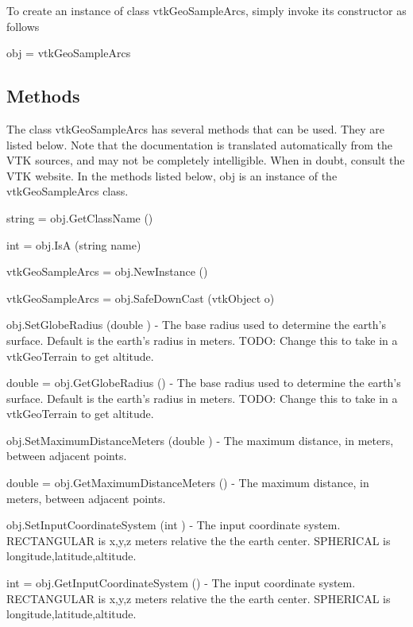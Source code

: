 To create an instance of class vtk\-Geo\-Sample\-Arcs, simply invoke its constructor as follows \begin{DoxyVerb}  obj = vtkGeoSampleArcs
\end{DoxyVerb}
 \hypertarget{vtkwidgets_vtkxyplotwidget_Methods}{}\subsection{Methods}\label{vtkwidgets_vtkxyplotwidget_Methods}
The class vtk\-Geo\-Sample\-Arcs has several methods that can be used. They are listed below. Note that the documentation is translated automatically from the V\-T\-K sources, and may not be completely intelligible. When in doubt, consult the V\-T\-K website. In the methods listed below, {\ttfamily obj} is an instance of the vtk\-Geo\-Sample\-Arcs class. 
\begin{DoxyItemize}
\item {\ttfamily string = obj.\-Get\-Class\-Name ()}  
\item {\ttfamily int = obj.\-Is\-A (string name)}  
\item {\ttfamily vtk\-Geo\-Sample\-Arcs = obj.\-New\-Instance ()}  
\item {\ttfamily vtk\-Geo\-Sample\-Arcs = obj.\-Safe\-Down\-Cast (vtk\-Object o)}  
\item {\ttfamily obj.\-Set\-Globe\-Radius (double )} -\/ The base radius used to determine the earth's surface. Default is the earth's radius in meters. T\-O\-D\-O\-: Change this to take in a vtk\-Geo\-Terrain to get altitude.  
\item {\ttfamily double = obj.\-Get\-Globe\-Radius ()} -\/ The base radius used to determine the earth's surface. Default is the earth's radius in meters. T\-O\-D\-O\-: Change this to take in a vtk\-Geo\-Terrain to get altitude.  
\item {\ttfamily obj.\-Set\-Maximum\-Distance\-Meters (double )} -\/ The maximum distance, in meters, between adjacent points.  
\item {\ttfamily double = obj.\-Get\-Maximum\-Distance\-Meters ()} -\/ The maximum distance, in meters, between adjacent points.  
\item {\ttfamily obj.\-Set\-Input\-Coordinate\-System (int )} -\/ The input coordinate system. R\-E\-C\-T\-A\-N\-G\-U\-L\-A\-R is x,y,z meters relative the the earth center. S\-P\-H\-E\-R\-I\-C\-A\-L is longitude,latitude,altitude.  
\item {\ttfamily int = obj.\-Get\-Input\-Coordinate\-System ()} -\/ The input coordinate system. R\-E\-C\-T\-A\-N\-G\-U\-L\-A\-R is x,y,z meters relative the the earth center. S\-P\-H\-E\-R\-I\-C\-A\-L is longitude,latitude,altitude.  

\end{DoxyItemize}

